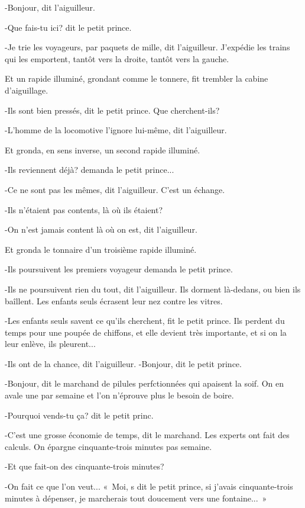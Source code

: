 \documentclass{report}
\begin{document}
-Bonjour, dit l'aiguilleur.

-Que fais-tu ici? dit le petit prince.

-Je trie les voyageurs, par paquets de mille, dit l'aiguilleur. J'expédie les trains qui les emportent, tantôt vers la droite, tantôt vers la gauche.

Et un rapide illuminé, grondant comme le tonnere, fit trembler la cabine d'aiguillage.

-Ils sont bien pressés, dit le petit prince. Que cherchent-ils?

-L'homme de la locomotive l'ignore lui-même, dit l'aiguilleur.

Et gronda, en sens inverse, un second rapide illuminé.

-Ils reviennent déjà? demanda le petit prince...

-Ce ne sont pas les mêmes, dit l'aiguilleur. C'est un échange.

-Ils n'étaient pas contents, là où ils étaient?

-On n'est jamais content là où on est, dit l'aiguilleur.

Et gronda le tonnaire d'un troisième rapide illuminé.

-Ils poursuivent les premiers voyageur demanda le petit prince.

-Ils ne poursuivent rien du tout, dit l'aiguilleur. Ils dorment là-dedans, ou bien ils ba\^illent. Les enfants seuls écrasent leur nez contre les vitres.

-Les enfants seuls savent ce qu'ils cherchent, fit le petit prince. Ils perdent du temps pour une poupée de chiffons, et elle devient très importante, et si on la leur enlève, ils pleurent...

-Ils ont de la chance, dit l'aiguilleur.
\parachapter{} %
-Bonjour, dit le petit prince.

-Bonjour, dit le marchand de pilules perfctionnées qui apaisent la soif. On en avale une par semaine et l'on n'éprouve plus le besoin de boire.

-Pourquoi vends-tu ça? dit le petit princ.

-C'est une grosse économie de temps, dit le marchand. Les experts ont fait des calculs. On épargne cinquante-trois minutes pas semaine.

-Et que fait-on des cinquante-trois minutes?

-On fait ce que l'on veut...
«~Moi, s dit le petit prince, si j'avais cinquante-trois minutes à dépenser, je marcherais tout doucement vers une fontaine...~»
\end{document}
